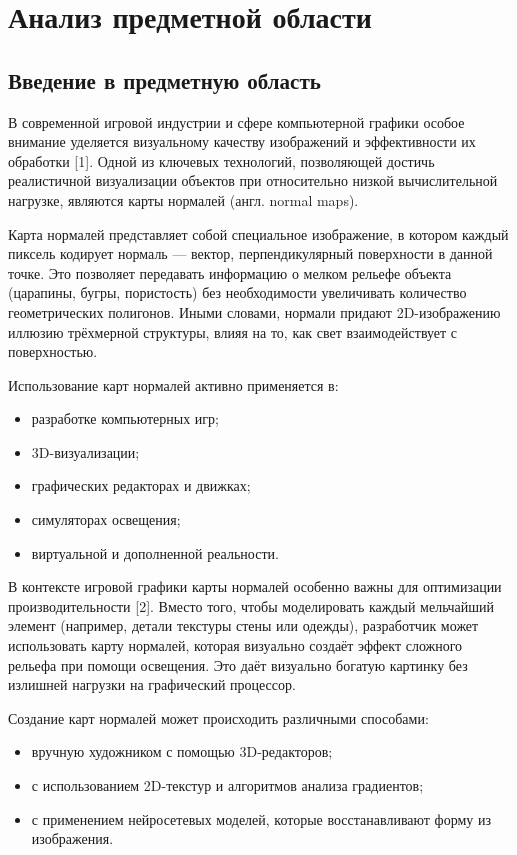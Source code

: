 \section{Анализ предметной области}
\subsection{Введение в предметную область}

В современной игровой индустрии и сфере компьютерной графики особое внимание уделяется визуальному качеству изображений и эффективности их обработки [1]. Одной из ключевых технологий, позволяющей достичь реалистичной визуализации объектов при относительно низкой вычислительной нагрузке, являются карты нормалей (англ. normal maps).

Карта нормалей представляет собой специальное изображение, в котором каждый пиксель кодирует нормаль — вектор, перпендикулярный поверхности в данной точке. Это позволяет передавать информацию о мелком рельефе объекта (царапины, бугры, пористость) без необходимости увеличивать количество геометрических полигонов. Иными словами, нормали придают 2D-изображению иллюзию трёхмерной структуры, влияя на то, как свет взаимодействует с поверхностью.

Использование карт нормалей активно применяется в:
\begin{itemize}
	\item разработке компьютерных игр;
	\item 3D-визуализации;
	\item графических редакторах и движках;
	\item симуляторах освещения;
	\item виртуальной и дополненной реальности.
\end{itemize}

В контексте игровой графики карты нормалей особенно важны для оптимизации производительности [2]. Вместо того, чтобы моделировать каждый мельчайший элемент (например, детали текстуры стены или одежды), разработчик может использовать карту нормалей, которая визуально создаёт эффект сложного рельефа при помощи освещения. Это даёт визуально богатую картинку без излишней нагрузки на графический процессор.

Создание карт нормалей может происходить различными способами:
\begin{itemize}
	\item вручную художником с помощью 3D-редакторов;
	\item с использованием 2D-текстур и алгоритмов анализа градиентов;
	\item с применением нейросетевых моделей, которые восстанавливают форму из изображения.
\end{itemize}

